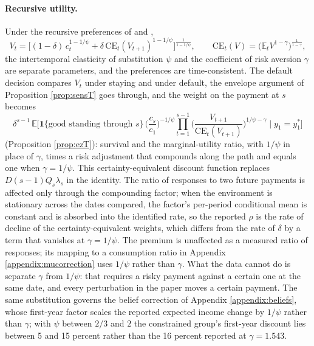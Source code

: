 \documentclass[12pt,english]{article}
\begin{document}
\paragraph{Recursive utility.}\label{sec:ezkp} Under the recursive preferences of \citet{kreps_temporal_1978} and \citet{epstein_substitution_1989},
\begin{equation}\label{eq:ez}
V_t = \Big[(1-\delta)\,c_t^{1-1/\psi} + \delta\,\mathrm{CE}_t(V_{t+1})^{1-1/\psi}\Big]^{\frac{1}{1-1/\psi}}, \qquad \mathrm{CE}_t(V) = \big(\mathbb{E}_t V^{1-\gamma}\big)^{\frac{1}{1-\gamma}},
\end{equation}
the intertemporal elasticity of substitution $\psi$ and the coefficient of risk aversion $\gamma$ are separate parameters, and the preferences are time-consistent. The default decision compares $V_t$ under staying and under default, the envelope argument of Proposition \ref{prop:sensT} goes through, and the weight on the payment at $s$ becomes
\begin{equation}\label{eq:ezweight}
\delta^{s-1}\,\mathbb{E}\Big[\mathbf{1}\{\text{good standing through } s\}\,\Big(\frac{c_s}{c_1}\Big)^{-1/\psi}\prod_{t=1}^{s-1}\Big(\frac{V_{t+1}}{\mathrm{CE}_t(V_{t+1})}\Big)^{1/\psi-\gamma}\;\Big|\; y_1 = y_1^*\Big]
\end{equation}
(Proposition \ref{prop:ezT}): survival and the marginal-utility ratio, with $1/\psi$ in place of $\gamma$, times a risk adjustment that compounds along the path and equals one when $\gamma = 1/\psi$. This certainty-equivalent discount function replaces $D(s-1)Q_s\lambda_s$ in the identity. The ratio of responses to two future payments is affected only through the compounding factor; when the environment is stationary across the dates compared, the factor's per-period conditional mean is constant and is absorbed into the identified rate, so the reported $\rho$ is the rate of decline of the certainty-equivalent weights, which differs from the rate of $\delta$ by a term that vanishes at $\gamma = 1/\psi$. The premium is unaffected as a measured ratio of responses; its mapping to a consumption ratio in Appendix \ref{appendix:mucorrection} uses $1/\psi$ rather than $\gamma$. What the data cannot do is separate $\gamma$ from $1/\psi$: that requires a risky payment against a certain one at the same date, and every perturbation in the paper moves a certain payment. The same substitution governs the belief correction of Appendix \ref{appendix:beliefs}, whose first-year factor scales the reported expected income change by $1/\psi$ rather than $\gamma$; with $\psi$ between $2/3$ and $2$ \citep{epstein_substitution_1991, bansal_risks_2004} the constrained group's first-year discount lies between 5 and 15 percent rather than the 16 percent reported at $\gamma = 1.543$.
\end{document}
